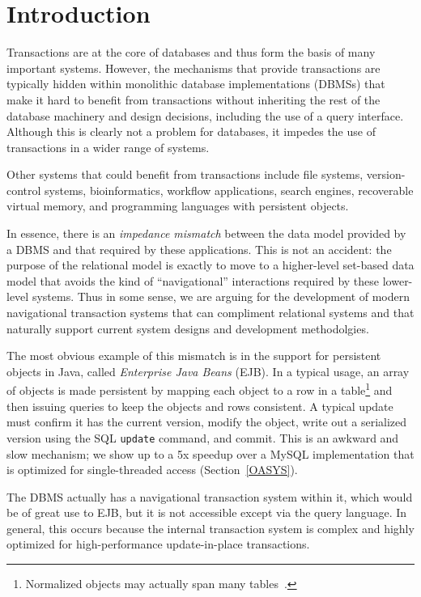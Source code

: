 \documentclass[10pt,letterpaper,twocolumn,english]{article}
\begin{document}
\vspace*{-18pt}


\section{Introduction}

Transactions are at the core of databases and thus form the basis of many
important systems. However, the mechanisms that provide transactions are
typically hidden within monolithic database implementations (DBMSs) that make
it hard to benefit from transactions without inheriting the rest of
the database machinery and design decisions, including the use of a
query interface.  Although this is clearly not a problem for
databases, it impedes the use of transactions in a wider range of
systems.

Other systems that could benefit from transactions include file
systems, version-control systems, bioinformatics, workflow
applications, search engines, recoverable virtual memory, and
programming languages with persistent objects.

In essence, there is an {\em impedance mismatch} between the data
model provided by a DBMS and that required by these applications. This is
not an accident: the purpose of the relational model is exactly to
move to a higher-level set-based data model that avoids the kind of
``navigational'' interactions required by these lower-level systems.
Thus in some sense, we are arguing for the development of modern
navigational transaction systems that can compliment relational systems 
and that naturally support current system designs and development methodolgies.

The most obvious example of this mismatch is in the support for
persistent objects in Java, called {\em Enterprise Java Beans}
(EJB). In a typical usage, an array of objects is made persistent by
mapping each object to a row in a table\footnote{Normalized objects may actually span many tables~\cite{hibernate}.}  and then issuing queries to keep the
objects and rows consistent. A typical update must confirm it has the
current version, modify the object, write out a serialized version
using the SQL {\tt update} command, and commit.  This is an awkward
and slow mechanism; we show up to a 5x speedup over a MySQL implementation 
that is optimized for single-threaded access (Section~\ref{OASYS}).

The DBMS actually has a navigational transaction system within it,
which would be of great use to EJB, but it is not accessible except
via the query language.  In general, this occurs because the internal
transaction system is complex and highly optimized for
high-performance update-in-place transactions.
\end{document}
